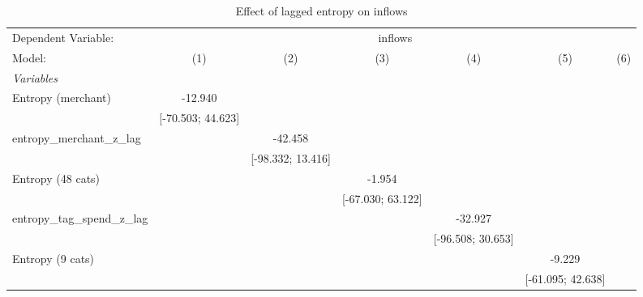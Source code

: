 
\begin{table}[htbp]
   \centering
   \tiny
   \begin{threeparttable}[b]
      \caption{\label{tab:reg_inflows_lagged_z} Effect of lagged entropy on inflows}
      \begin{tabular}{lcccccc}
         \tabularnewline \midrule \midrule
         Dependent Variable: & \multicolumn{6}{c}{inflows}\\
         Model:                          & (1)                 & (2)                 & (3)                 & (4)                 & (5)                 & (6)\\  
         \midrule
         \emph{Variables}\\
         Entropy (merchant)              & -12.940             &                     &                     &                     &                     &   \\   
                                         & [-70.503; 44.623]   &                     &                     &                     &                     &   \\   
         entropy\_merchant\_z\_lag       &                     & -42.458             &                     &                     &                     &   \\   
                                         &                     & [-98.332; 13.416]   &                     &                     &                     &   \\   
         Entropy (48 cats)               &                     &                     & -1.954              &                     &                     &   \\   
                                         &                     &                     & [-67.030; 63.122]   &                     &                     &   \\   
         entropy\_tag\_spend\_z\_lag     &                     &                     &                     & -32.927             &                     &   \\   
                                         &                     &                     &                     & [-96.508; 30.653]   &                     &   \\   
         Entropy (9 cats)                &                     &                     &                     &                     & -9.229              &   \\   
                                         &                     &                     &                     &                     & [-61.095; 42.638]   &   \\   

\end{tabular}
\end{threeparttable}
\end{table}
